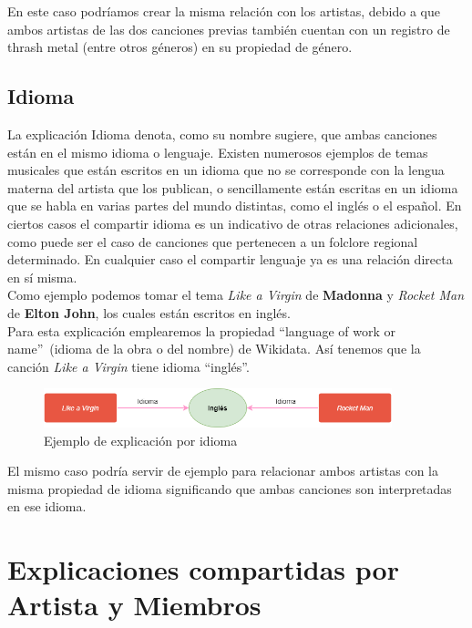 En este caso podríamos crear la misma relación con los artistas, debido a que ambos artistas de las dos canciones previas también cuentan con un registro de thrash metal (entre otros géneros) en su propiedad de género.\\

\subsection*{Idioma}

La explicación Idioma denota, como su nombre sugiere, que ambas canciones están en el mismo idioma o lenguaje. Existen numerosos ejemplos de temas musicales que están escritos en un idioma que no se corresponde con la lengua materna del artista que los publican, o sencillamente están escritas en un idioma que se habla en varias partes del mundo distintas, como el inglés o el español. En ciertos casos el compartir idioma es un indicativo de otras relaciones adicionales, como puede ser el caso de canciones que pertenecen a un folclore regional determinado. En cualquier caso el compartir lenguaje ya es una relación directa en sí misma.\\

Como ejemplo podemos tomar el tema \textit{Like a Virgin} de \textbf{Madonna} y \textit{Rocket Man} de \textbf{Elton John}, los cuales están escritos en inglés.\\

Para esta explicación emplearemos la propiedad ``language of work or name''~(idioma de la obra o del nombre) de Wikidata. Así tenemos que la canción \textit{Like a Virgin} tiene idioma ``inglés''.\\

\begin{figure}[h!]
	\centering
	\includegraphics[width = 0.9\textwidth]{Imagenes/Bitmap/Idioma ejemplo.png}
	\caption{Ejemplo de explicación por idioma}
	\label{fig:sampleImage}
\end{figure}

El mismo caso podría servir de ejemplo para relacionar ambos artistas con la misma propiedad de idioma significando que ambas canciones son interpretadas en ese idioma.\\

\section{Explicaciones compartidas por Artista y Miembros}


